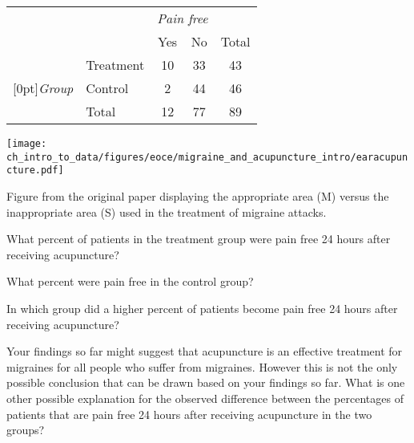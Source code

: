{\noindent\begin{minipage}[l]{0.4\textwidth}
\begin{tabular}{ll  cc c} 
			                         		&           & \multicolumn{2}{c}{\textit{Pain free}} \\
\cline{3-4}
			                        	 	&			& Yes 	& No 	                  & Total \\
\cline{2-5}
							& Treatment 	& 10	 	& 33		                  & 43 \\
\raisebox{1.5ex}[0pt]{\emph{Group}} & Control	 	& 2	 	& 44 	 	                  & 46 \\
\cline{2-5}
							& Total		& 12		& 77		                  & 89
\end{tabular}
\end{minipage}
\begin{minipage}[c]{0.05\textwidth}
\end{minipage}
\begin{minipage}[c]{0.27\textwidth}
\begin{center}
\texttt{[image: ch\_intro\_to\_data/figures/eoce/migraine\_and\_acupuncture\_intro/earacupuncture.pdf]}
\end{center}
\end{minipage}
\begin{minipage}[c]{0.25\textwidth}
{\footnotesize Figure from the original paper displaying the appropriate area 
(M) versus the inappropriate area (S) used in the treatment of migraine attacks.}
\end{minipage}
\begin{parts}
\item What percent of patients in the treatment group were pain free 24 hours 
after receiving acupuncture? 
\item What percent were pain free in the control group?
\item In which group did a higher percent of patients become pain free 24 hours 
after receiving acupuncture?
\item Your findings so far might suggest that acupuncture is an effective treatment 
for migraines for all people who suffer from migraines. However this is not the 
only possible conclusion that can be drawn based on your findings so far. What is 
one other possible explanation for the observed difference between the percentages 
of patients that are pain free 24 hours after receiving acupuncture in the two groups?
\end{parts}
}{}

